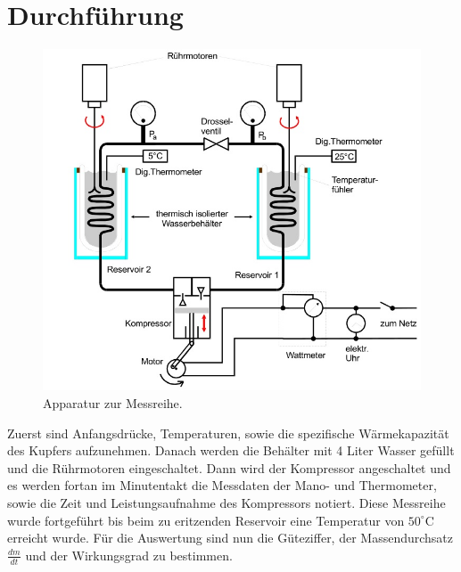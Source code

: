 \section{Durchführung}
\label{sec:Durchführung}
\begin{figure}
  \centering
  \includegraphics{data/Abb2.jpg}
  \caption{Apparatur zur Messreihe. \cite{AnleitungV206}}
  \label{fig:Abb2}
\end{figure}
Zuerst sind Anfangsdrücke, Temperaturen, sowie die spezifische Wärmekapazität des Kupfers aufzunehmen.
Danach werden die Behälter mit 4 Liter Wasser gefüllt und die Rührmotoren eingeschaltet.
Dann wird der Kompressor angeschaltet und es werden fortan im Minutentakt die Messdaten der Mano- und Thermometer, sowie die Zeit und Leistungsaufnahme des Kompressors notiert.
Diese Messreihe wurde fortgeführt bis beim zu eritzenden Reservoir eine Temperatur von $50^\circ\text{C}$ erreicht wurde.
Für die Auswertung sind nun die Güteziffer, der Massendurchsatz $\frac{dm}{dt}$ und der Wirkungsgrad zu bestimmen.